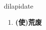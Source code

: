 
\begin{frame}
{\huge dilapidate}
\begin{center}
\begin{enumerate}\Large
  \item \textbf{(使)荒废}
\end{enumerate}
\end{center}
\end{frame}
